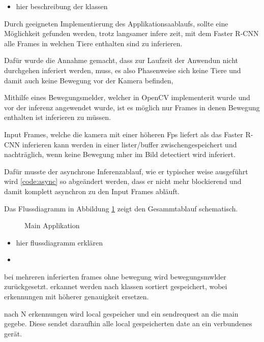 \begin{itemize}
    \item hier beschreibung der klassen
\end{itemize}


Durch geeigneten Implementierung des Applikationsaablaufs, 
sollte eine Möglichkeit gefunden werden, trotz langsamer infere 
zeit, mit dem Faster R-CNN alle Frames in welchen Tiere enthalten 
sind zu inferieren.

Dafür wurde die Annahme gemacht, dass zur Laufzeit der 
Anwendun nicht durchgehen inferiert werden, muss, es also 
Phasenweise sich keine Tiere und 
damit auch keine Bewegung vor der Kamera befinden,

Mithilfe eines Bewegungsmelder, welcher in OpenCV implementerit
wurde und vor der inferenz 
angewendet wurde, ist es möglich nur Frames in denen
Bewegung enthalten ist inferieren zu müssen. 


Input Frames, welche die kamera 
mit einer höheren Fps liefert als 
das Faster R-CNN inferieren kann werden in einer lister/buffer 
zwischengespeichert und nachträglich, wenn keine Bewegung 
mher im Bild detectiert wird inferiert.

Dafür musste der asynchrone Inferenzablauf, wie er typischer 
weise ausgeführt wird \ref{code:async} so abgeändert werden, 
dass er nicht mehr blockierend und damit komplett asynchron 
zu den Input Frames abläuft.

Das Flussdiagramm in Abbildung \ref{fig:flowchart_appl}
zeigt den Gesammtablauf schematisch.

\vspace{1cm}
\begin{figure}[H]
    \centering
        
    \caption{Main Applikation}
    \label{fig:flowchart_appl}
\end{figure}
\vspace{1cm}

\begin{itemize}
    \item hier flussdiagramm erklären
    \item 
\end{itemize}

bei mehreren inferierten frames ohne bewegung wird 
bewegungsmwlder zurückgesetzt.
erkannet werden nach klassen sortiert gespeichert, 
wobei erkennungen mit höherer genauigkeit ersetzen.

nach N erkennungen wird local gespeicher und ein 
sendrequest an die main gegebe. 
Diese sendet daraufhin alle local 
gespeicherten date an ein verbundenes gerät.

